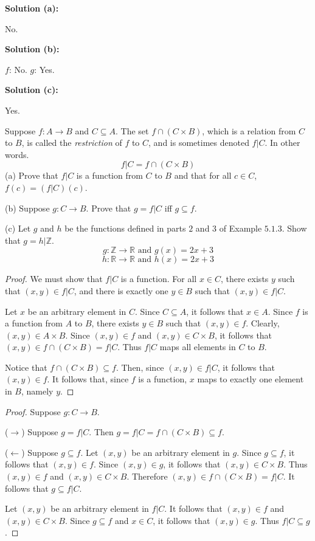 \textbf{Solution (a):}

No.

\textbf{Solution (b):}

$f$: No.
$g$: Yes.

\textbf{Solution (c):}

Yes.

\begin{tcolorbox}[title=Problem 7, breakable]
    Suppose $f : A \rightarrow B$ and $C \subseteq A$.
    The set $f \cap (C \times B)$, which is a relation from $C$ to $B$,
        is called the \emph{restriction} of $f$ to $C$, and is sometimes
        denoted $f | C$. 
    In other words.\
    \[f | C = f \cap (C \times B)\]
    (a) Prove that $f | C$ is a function from $C$ to $B$ and that for all $c \in C$,
        $f(c) = (f | C)(c)$.

    (b) Suppose $g : C \rightarrow B$. Prove that $g = f | C$ iff $g \subseteq f$.

    (c) Let $g$ and $h$ be the functions defined in parts $2$ and $3$ of Example $5.1.3$.
        Show that $g = h | \mathbb{Z}$.
        \[g : \mathbb{Z} \rightarrow \mathbb{R} \text{ and } g(x) = 2x + 3\]
        \[h : \mathbb{R} \rightarrow \mathbb{R} \text{ and } h(x) = 2x + 3\]
\end{tcolorbox}

\begin{proof}
    We must show that $f|C$ is a function.  
    For all $x \in C$, there exists $y$ such that $(x, y) \in f|C$,  
    and there is exactly one $y \in B$ such that $(x, y) \in f|C$.

    Let $x$ be an arbitrary element in $C$.
    Since $C \subseteq A$, it follows that $x \in A$.
    Since $f$ is a function from $A$ to $B$, 
        there exists $y \in B$ such that $(x, y) \in f$.
    Clearly, $(x, y) \in A \times B$.
    Since $(x, y) \in f$ and $(x, y) \in C \times B$,
        it follows that $(x, y) \in f \cap (C \times B) = f|C$.
    Thus $f|C$ maps all elements in $C$ to $B$.

    Notice that $f \cap (C \times B) \subseteq f$.
    Then, since $(x, y) \in f|C$, it follows that $(x, y) \in f$.
    It follows that, since $f$ is a function, 
        $x$ maps to exactly one element in $B$, namely $y$.
\end{proof}

\begin{proof}
    Suppose $g : C \rightarrow B$.

    ($\rightarrow$) Suppose $g = f|C$.
    Then $g = f|C = f \cap (C \times B) \subseteq f$.

    ($\leftarrow$) Suppose $g \subseteq f$.
    Let $(x, y)$ be an arbitrary element in $g$.
    Since $g \subseteq f$, it follows that $(x, y) \in f$.
    Since $(x, y) \in g$, it follows that $(x, y) \in C \times B$.
    Thus $(x, y) \in f$ and $(x, y) \in C \times B$.
    Therefore $(x, y) \in f \cap (C \times B) = f|C$.
    It follows that $g \subseteq f|C$.

    Let $(x, y)$ be an arbitrary element in $f|C$.
    It follows that $(x, y) \in f$ and $(x, y) \in C \times B$.
    Since $g \subseteq f$ and $x \in C$, it follows that $(x, y) \in g$.
    Thus $f|C \subseteq g$.
\end{proof}

